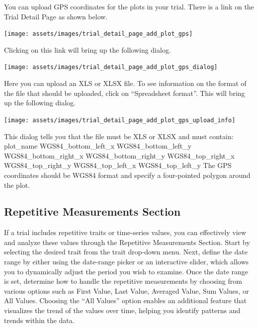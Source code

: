 \documentclass[
  12pt,
]{book}
\begin{document}
You can upload GPS coordinates for the plots in your trial. There is a link on the Trial Detail Page as shown below.

\begin{center}\texttt{[image: assets/images/trial\_detail\_page\_add\_plot\_gps]} \end{center}

Clicking on this link will bring up the following dialog.

\begin{center}\texttt{[image: assets/images/trial\_detail\_page\_add\_plot\_gps\_dialog]} \end{center}

Here you can upload an XLS or XLSX file. To see information on the format of the file that should be uploaded, click on ``Spreadsheet format''. This will bring up the following dialog.

\begin{center}\texttt{[image: assets/images/trial\_detail\_page\_add\_plot\_gps\_upload\_info]} \end{center}

This dialog tells you that the file must be XLS or XLSX and must contain: plot\_name WGS84\_bottom\_left\_x WGS84\_bottom\_left\_y WGS84\_bottom\_right\_x WGS84\_bottom\_right\_y WGS84\_top\_right\_x WGS84\_top\_right\_y WGS84\_top\_left\_x WGS84\_top\_left\_y The GPS coordinates should be WGS84 format and specify a four-pointed polygon around the plot.

\hypertarget{repetitive-measurements-section}{%
\subsection{Repetitive Measurements Section}\label{repetitive-measurements-section}}

If a trial includes repetitive traits or time-series values, you can effectively view and analyze these values through the Repetitive Measurements Section. Start by selecting the desired trait from the trait drop-down menu. Next, define the date range by either using the date-range picker or an interactive slider, which allows you to dynamically adjust the period you wish to examine. Once the date range is set, determine how to handle the repetitive measurements by choosing from various options such as First Value, Last Value, Averaged Value, Sum Values, or All Values. Choosing the ``All Values'' option enables an additional feature that visualizes the trend of the values over time, helping you identify patterns and trends within the data.
\end{document}
